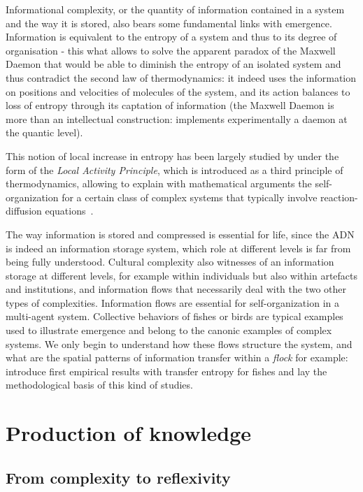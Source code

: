 Informational complexity, or the quantity of information contained in a system and the way it is stored, also bears some fundamental links with emergence. Information is equivalent to the entropy of a system and thus to its degree of organisation - this what allows to solve the apparent paradox of the Maxwell Daemon that would be able to diminish the entropy of an isolated system and thus contradict the second law of thermodynamics: it indeed uses the information on positions and velocities of molecules of the system, and its action balances to loss of entropy through its captation of information (the Maxwell Daemon is more than an intellectual construction: \cite{cottet2017observing} implements experimentally a daemon at the quantic level).

This notion of local increase in entropy has been largely studied by  under the form of the \emph{Local Activity Principle}, which is introduced as a third principle of thermodynamics, allowing to explain with mathematical arguments the self-organization for a certain class of complex systems that typically involve reaction-diffusion equations~\cite{mainzer2013local}.


The way information is stored and compressed is essential for life, since the ADN is indeed an information storage system, which role at different levels is far from being fully understood. Cultural complexity also witnesses of an information storage at different levels, for example within individuals but also within artefacts and institutions, and information flows that necessarily deal with the two other types of complexities. Information flows are essential for self-organization in a multi-agent system. Collective behaviors of fishes or birds are typical examples used to illustrate emergence and belong to the canonic examples of complex systems. We only begin to understand how these flows structure the system, and what are the spatial patterns of information transfer within a \emph{flock} for example: \cite{crosato2017informative} introduce first empirical results with transfer entropy for fishes and lay the methodological basis of this kind of studies. 


\section{Production of knowledge}

\subsection{From complexity to reflexivity}

